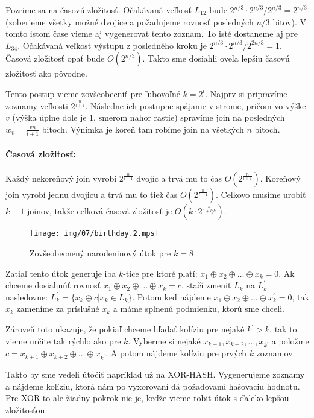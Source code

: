 Pozrime sa na časovú zložitosť. Očakávaná veľkosť $L_{12}$ bude $2^{n/3} \cdot 2^{n/3} / 2^{n/3} = 2^{n/3}$ (zoberieme všetky možné
dvojice a požadujeme rovnosť posledných $n/3$ bitov). V tomto istom čase vieme aj vygenerovať tento zoznam. To isté
dostaneme aj pre $L_{34}$. Očakávaná veľkosť výstupu z posledného kroku je $2^{n/3} \cdot 2^{n/3} / 2^{2n/3} = 1$.
Časová zložitosť opať bude $O(2^{n/3})$. Takto sme dosiahli oveľa lepšiu časovú zložitosť ako pôvodne.

Tento postup vieme zovšeobecniť pre ľubovoľné $k = 2^l$. 
Najprv si pripravíme zoznamy veľkosti $2^{\frac{n}{l+1}}$. Následne ich postupne spájame v strome, pričom
vo výške $v$ (výška úplne dole je $1$, smerom nahor rastie) spravíme join na posledných $w_v = \frac{vn}{l + 1}$
bitoch. Výnimka je koreň tam robíme join na všetkých $n$ bitoch.

\paragraph{Časová zložitosť:}
Každý nekoreňový join vyrobí $2^{\frac{n}{l+1}}$ dvojíc 
a trvá mu to čas $O(2^{\frac{n}{l+1}})$.
Koreňový join vyrobí jednu dvojicu a trvá mu to tiež čas 
$O(2^{\frac{n}{l+1}})$. Celkovo musíme urobiť $k-1$ joinov, takže
celková časová zložitosť je $O(k\cdot 2^{\frac{n}{1+lg k}})$.

\begin{figure}
    \centering
    \texttt{[image: img/07/birthday.2.mps]}
    \caption{Zovšeobecnený narodeninový útok pre $k=8$}
\end{figure}

Zatiaľ tento útok generuje iba $k$-tice pre ktoré platí: $x_1 \oplus x_2 \oplus \dots \oplus x_k = 0$. 
Ak chceme dosiahnúť rovnosť $x_1 \oplus x_2 \oplus \dots \oplus x_k = c$, stačí zmeniť $L_k$ na $L_k^{'}$
nasledovne: $L_k^{'} = \{x_k \oplus c | x_k \in L_k\}$. Potom keď nájdeme $x_1 \oplus x_2 \oplus \dots \oplus x_k^{'} = 0$,
tak $x_k^{'}$ zameníme za príslušné $x_k$ a máme splnenú podmienku, ktorú sme chceli.

Zároveň toto ukazuje, že pokiaľ chceme hľadať kolíziu pre nejaké $k^{'} > k$, tak to vieme
určite tak rýchlo ako pre $k$. Vyberme si nejaké $x_{k+1}, x_{k+2}, \dots, x_{k^{'}}$ a položme
$c = x_{k+1} \oplus x_{k+2} \oplus \dots \oplus x_{k^{'}}$. A potom nájdeme kolíziu pre prvých $k$ zoznamov. 

Takto by sme vedeli útočiť napríklad už na XOR-HASH. Vygenerujeme zoznamy a nájdeme kolíziu, ktorá nám po
vyxorovaní dá požadovanú hašovaciu hodnotu. Pre XOR to ale žiadny pokrok nie je, keďže vieme robiť
útok s ďaleko lepšou zložitosťou.


